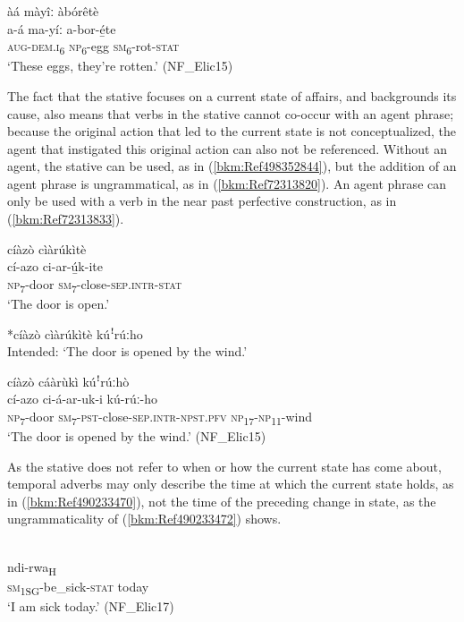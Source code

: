 \ea
\label{bkm:Ref469498587}
àá màyîː àbórêtè\\
\gll a-á    ma-yíː    a-bor-é̲te\\
\textsc{aug}-\textsc{dem}.\textsc{i}\textsubscript{6}  \textsc{np}\textsubscript{6}-egg  \textsc{sm}\textsubscript{6}-rot-\textsc{stat} \\
\glt ‘These eggs, they’re rotten.’ (NF\_Elic15)
\z

The fact that the stative focuses on a current state of affairs, and backgrounds its cause, also means that verbs in the stative cannot co-occur with an agent phrase; because the original action that led to the current state is not conceptualized, the agent that instigated this original action can also not be referenced. Without an agent, the stative can be used, as in (\ref{bkm:Ref498352844}), but the addition of an agent phrase is ungrammatical, as in (\ref{bkm:Ref72313820}). An agent phrase can only be used with a verb in the near past perfective construction, as in (\ref{bkm:Ref72313833}).

\ea
\label{bkm:Ref498352844}
cíàzò cìàrúkìtè\\
\gll cí-azo    ci-ar-ú̲k-ite\\
\textsc{np}\textsubscript{7}-door  \textsc{sm}\textsubscript{7}-close-\textsc{sep}.\textsc{intr}-\textsc{stat}\\
\glt ‘The door is open.’
\z

\ea
\label{bkm:Ref72313820}
  *cíàzò cìàrúkìtè kúꜝrúːho\\
Intended: ‘The door is opened by the wind.’
\z

\ea
\label{bkm:Ref72313833}
cíàzò cáàrùkì kúꜝrúːhò\\
\gll cí-azo    ci-á-ar-uk-i        kú-rúː-ho\\
\textsc{np}\textsubscript{7}-door  \textsc{sm}\textsubscript{7}-\textsc{pst}-close-\textsc{sep}.\textsc{intr}-\textsc{npst}.\textsc{pfv}  \textsc{np}\textsubscript{17}-\textsc{np}\textsubscript{11}-wind\\
\glt ‘The door is opened by the wind.’ (NF\_Elic15)
\z

As the stative does not refer to when or how the current state has come about, temporal adverbs may only describe the time at which the current state holds, as in (\ref{bkm:Ref490233470}), not the time of the preceding change in state, as the ungrammaticality of (\ref{bkm:Ref490233472}) shows.

\ea
\label{bkm:Ref490233470}
\glll {}\\
ndi-rwa\textsubscript{H}\\
\textsc{sm}\textsubscript{1SG}-be\_sick-\textsc{stat}  today\\
\glt ‘I am sick today.’ (NF\_Elic17)
\z

